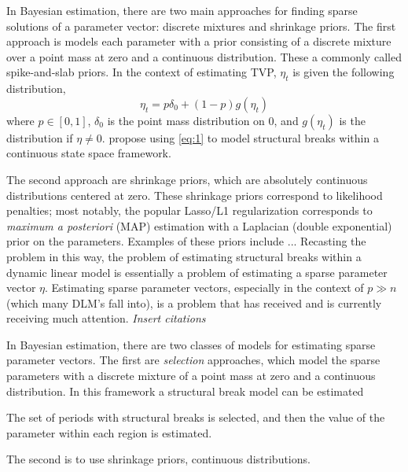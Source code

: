 \documentclass{article}
\begin{document}
In Bayesian estimation, there are two main approaches for finding sparse solutions of a parameter vector: discrete mixtures and shrinkage priors.
The first approach is models each parameter with a prior consisting of a discrete mixture over a point mass at zero and a continuous distribution.
These a commonly called spike-and-slab priors.
In the context of estimating TVP, $\eta_{t}$ is given the following distribution,
\begin{equation}
  \label{eq:1}
  \eta_{t} = p \delta_{0} +  (1 - p) g(\eta_{t})
\end{equation}
where $p \in [0, 1]$, $\delta_{0}$ is the point mass distribution on 0, and $g(\eta_{t})$ is the distribution if $\eta \neq 0$.
\textcite{GiordaniKohn2008} propose using \eqref{eq:1} to model structural breaks within a continuous state space framework.

The second approach are shrinkage priors, which are absolutely continuous distributions centered at zero.
These shrinkage priors correspond to likelihood penalties; most notably, the popular Lasso/L1 regularization corresponds to \textit{maximum a posteriori} (MAP) estimation with a Laplacian (double exponential) prior on the parameters.
Examples of these priors include ... 
Recasting the problem in this way, the problem of estimating structural breaks within a dynamic linear model is essentially a problem of estimating a sparse parameter vector $\eta$.
Estimating sparse parameter vectors, especially in the context of $p \gg n$ (which many DLM's fall into), is a problem that has received and is currently receiving much attention.
\textit{Insert citations}

In Bayesian estimation, there are two classes of models for estimating sparse parameter vectors.
The first are \textit{selection} approaches, which model the sparse parameters with a discrete mixture of a point mass at zero and a continuous distribution.
In this framework a structural break model can be estimated 

\textcite{GiordaniKohn2008} 
The set of periods with structural breaks is selected, and then the value of the parameter within each region is estimated. 

The second is to use shrinkage priors, continuous distributions.

\end{document}
